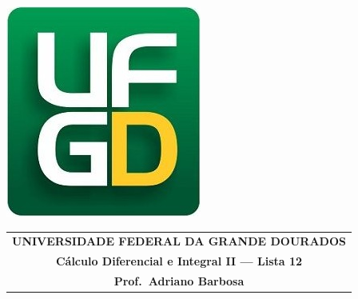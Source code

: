 \documentclass[a4paper,5pt]{amsbook}
\begin{document}
\thispagestyle{empty}
\pagestyle{empty}
\begin{minipage}[h]{0.14\textwidth}
    \includegraphics[scale=0.24]{../../ufgd.png}
\end{minipage}
\begin{minipage}[h]{\textwidth}
    \begin{tabular}{c}
        {{\bf UNIVERSIDADE FEDERAL DA GRANDE DOURADOS}}\\
        {{\bf C\'{a}lculo Diferencial e Integral II --- Lista 12}}\\
        {{\bf Prof.\ Adriano Barbosa}}\\
    \end{tabular}
    \vspace{-0.45cm}
\end{minipage}

\end{document}
